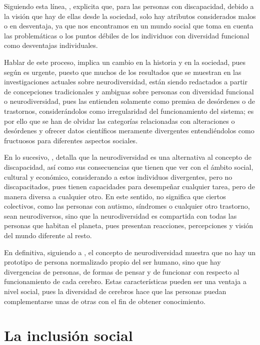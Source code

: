 \documentclass[spanish]{textolivre}
\begin{document}
Siguiendo esta línea, \textcite{ortega_brecha_2019}, explicita que, para las personas con discapacidad, debido a la visión que hay de ellas desde la sociedad, solo hay atributos considerados malos o en desventaja, ya que nos encontramos en un mundo social que toma en cuenta las problemáticas o los puntos débiles de los individuos con diversidad funcional como desventajas individuales.

Hablar de este proceso, implica un cambio en la historia y en la sociedad, pues según \textcite{lopez_neurodiversidad_2010} es urgente, puesto que muchos de los resultados que se muestran en las investigaciones actuales sobre neurodiversidad, están siendo redactados a partir de concepciones tradicionales y ambiguas sobre personas con diversidad funcional o neurodiversidad, pues las entienden solamente como premisa de desórdenes o de trastornos, considerándolos como irregularidad del funcionamiento del sistema; es por ello que se han de olvidar las categorías relacionadas con alteraciones o desórdenes y ofrecer datos científicos meramente divergentes entendiéndolos como fructuosos para diferentes aspectos sociales.

En lo sucesivo, \textcite{sanchez_paradigma_2020}, detalla que la neurodiversidad es una alternativa al concepto de discapacidad, así como sus consecuencias que tienen que ver con el ámbito social, cultural y económico, considerando a estos individuos divergentes, pero no discapacitados, pues tienen capacidades para desempeñar cualquier tarea, pero de manera diversa a cualquier otro. En este sentido, no significa que ciertos colectivos, como las personas con autismo, síndromes o cualquier otro trastorno, sean neurodiversos, sino que la neurodiversidad es compartida con todas las personas que habitan el planeta, pues presentan reacciones, percepciones y visión del mundo diferente al resto.

En definitiva, siguiendo a \textcite{sanchez_paradigma_2020}, el concepto de neurodiversidad muestra que no hay un prototipo de persona normalizado propio del ser humano, sino que hay divergencias de personas, de formas de pensar y de funcionar con respecto al funcionamiento de cada cerebro. Estas características pueden ser una ventaja a nivel social, pues la diversidad de cerebros hace que las personas puedan complementarse unas de otras con el fin de obtener conocimiento.

\section{La inclusión social}
\end{document}
